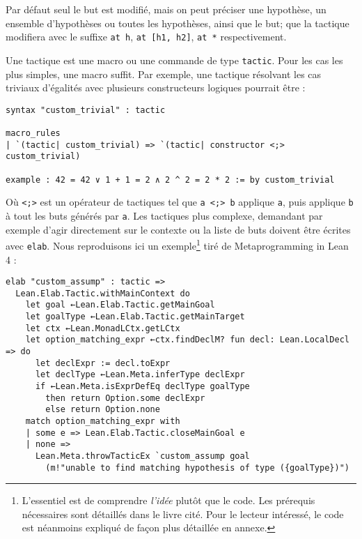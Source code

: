 \documentclass[a4paper, 12pt]{article}
\newcommand{\lean}[1]{\texttt{#1}}
\begin{document}
Par défaut seul le but est modifié, mais on peut préciser une hypothèse, un ensemble d'hypothèses ou toutes les hypothèses, ainsi que le but; que la tactique modifiera avec le suffixe \lean{at h}, \lean{at [h1, h2]}, \lean{at *} respectivement.

\vspace{\baselineskip}
Une tactique est une macro ou une commande de type \lean{tactic}. Pour les cas les plus simples, une macro suffit. Par exemple, une tactique résolvant les cas triviaux d'égalités avec plusieurs constructeurs logiques pourrait être :

\begin{verbatim}
syntax "custom_trivial" : tactic

macro_rules
| `(tactic| custom_trivial) => `(tactic| constructor <;> custom_trivial)

example : 42 = 42 ∨ 1 + 1 = 2 ∧ 2 ^ 2 = 2 * 2 := by custom_trivial
\end{verbatim}

Où \lean{<;>} est un opérateur de tactiques tel que \lean{a <;> b} applique \lean{a}, puis applique \lean{b} à tout les buts générés par \lean{a}. Les tactiques plus complexe, demandant par exemple d'agir directement sur le contexte ou la liste de buts doivent être écrites avec \lean{elab}. Nous reproduisons ici un exemple\footnote{L'essentiel est de comprendre \textit{l'idée} plutôt que le code. Les prérequis nécessaires sont détaillés dans le livre cité. Pour le lecteur intéressé, le code est néanmoins expliqué de façon plus détaillée en annexe.} tiré de Metaprogramming in Lean 4 \cite{meta_lean} :

\begin{listing}[H]
    \begin{verbatim}
elab "custom_assump" : tactic =>
  Lean.Elab.Tactic.withMainContext do
    let goal ←Lean.Elab.Tactic.getMainGoal
    let goalType ←Lean.Elab.Tactic.getMainTarget
    let ctx ←Lean.MonadLCtx.getLCtx
    let option_matching_expr ←ctx.findDeclM? fun decl: Lean.LocalDecl => do
      let declExpr := decl.toExpr
      let declType ←Lean.Meta.inferType declExpr
      if ←Lean.Meta.isExprDefEq declType goalType
        then return Option.some declExpr
        else return Option.none
    match option_matching_expr with
    | some e => Lean.Elab.Tactic.closeMainGoal e
    | none =>
      Lean.Meta.throwTacticEx `custom_assump goal
        (m!"unable to find matching hypothesis of type ({goalType})")
    \end{verbatim}
    \label{code:custom_assump}
\end{listing}
\end{document}
